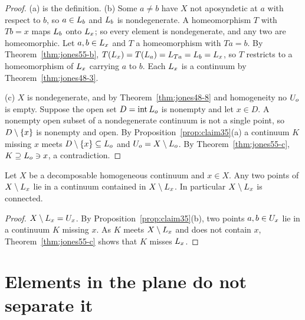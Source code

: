 \begin{proof}
(a) is the definition. (b) Some $a\ne b$ have $X$ not aposyndetic at $a$ with respect to $b$, so $a\in L_{b}$ and $L_{b}$
is nondegenerate. A homeomorphism $T$ with $Tb=x$ maps $L_{b}$ onto $L_{x}$; so every element is nondegenerate, and any
two are homeomorphic. Let $a,b\in L_{x}$ and $T$ a homeomorphism with $Ta=b$. By Theorem~\ref{thm:jones55-b},
$T(L_{x})=T(L_{a})=L_{Ta}=L_{b}=L_{x}$, so $T$ restricts to a homeomorphism of $L_{x}$ carrying $a$ to $b$. Each $L_{x}$
is a continuum by Theorem~\ref{thm:jones48-3}.

(c) $X$ is nondegenerate, and by Theorem~\ref{thm:jones48-8} and homogeneity no $U_{o}$ is empty. Suppose the open set
$D=\operatorname{int}L_{o}$ is nonempty and let $x\in D$. A nonempty open subset of a nondegenerate continuum is not a single
point, so $D\setminus\left\{ x \right\}$ is nonempty and open. By Proposition~\ref{prop:claim35}(a) a continuum $K$ missing $x$ meets
$D\setminus\left\{ x \right\}\subseteq L_{o}$ and $U_{o}=X\setminus L_{o}$. By Theorem~\ref{thm:jones55-c}, $K\supseteq L_{o}\ni x$, a
contradiction.
\end{proof}


\begin{proposition}\label{prop:compl-connected}
Let $X$ be a decomposable homogeneous continuum and $x\in X$. Any two points of $X\setminus L_{x}$ lie in a continuum
contained in $X\setminus L_{x}$. In particular $X\setminus L_{x}$ is connected.
\end{proposition}

\begin{proof}
$X\setminus L_{x}=U_{x}$. By Proposition~\ref{prop:claim35}(b), two points $a,b\in U_{x}$ lie in a continuum $K$ missing $x$.
As $K$ meets $X\setminus L_{x}$ and does not contain $x$, Theorem~\ref{thm:jones55-c} shows that $K$ misses $L_{x}$.
\end{proof}


\section{Elements in the plane do not separate it}


